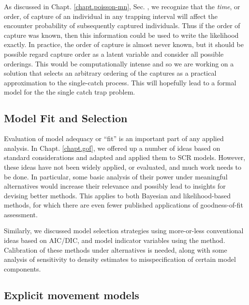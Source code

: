 As discussed in Chapt. \ref{chapt.poisson-mn},
Sec. \label{poisson-mn.sec.singlecatch},
we recognize that the {\it time}, or order, of capture of an
individual in any trapping interval will affect the encounter
probability of subsequently captured individuals. Thus if
the order of capture was known, then this information could be
used to write the likelihood exactly. In practice, the order of capture
is almost never known, but %
it should be possible regard capture order as a latent variable and consider all
possible orderings.
This would be %
computationally intense and so we are working on a solution that selects
an arbitrary ordering of the captures as a practical approximation to the
single-catch process. This will hopefully lead to a formal model
for the the single catch trap problem.

\subsection{Model Fit and Selection}

Evaluation of model adequacy or ``fit'' is an important part of any
applied analysis. In Chapt. \ref{chapt.gof}, we offered up a number of
ideas based on standard considerations and adapted and applied them
to SCR models. However, these ideas have not been widely applied, or
evaluated, and much work needs to be done. In particular, some basic
analysis of their power under meaningful alternatives would increase
their relevance and possibly lead to insights for devising better
methods. This applies to both Bayesian and likelihood-based methods,
for which there are even fewer published applications of
goodness-of-fit assessment.

Similarly, we discussed model selection strategies using more-or-less
conventional ideas based on AIC/DIC, and model indicator variables
using the \citet{kuo_mallick:1998} method. Calibration of these
methods under alternatives is needed, along with some analysis of
sensitivity to density estimates to misspecification of certain model
components.


\subsection{Explicit movement models}


